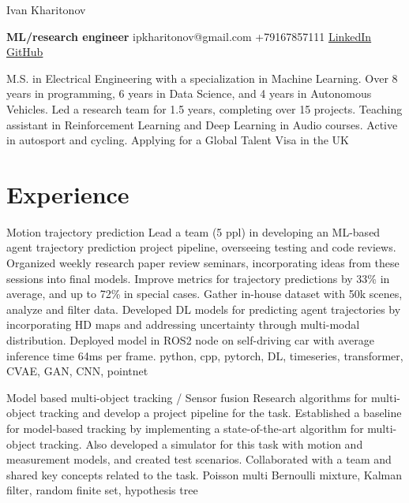 \documentclass[]{resume}
\begin{document}
\begin{center}
	\Huge Ivan Kharitonov \par
	\normalsize  \textbf{ML/research engineer} \hfill ipkharitonov@gmail.com \hfill +79167857111 \hfill \href{https://www.linkedin.com/in/ivan-kharitonov-main/}{LinkedIn} \hfill \href{https://github.com/kharitonov-ivan}{GitHub}
\end{center}
\vspace{-1em}

\noindent M.S. in Electrical Engineering with a specialization in Machine Learning. Over 8 years in programming, 6 years in Data Science, and 4 years in Autonomous Vehicles. Led a research team for 1.5 years, completing over 15 projects. Teaching assistant in Reinforcement Learning and Deep Learning in Audio courses. Active in autosport and cycling. Applying for a Global Talent Visa in the UK

\section*{\sectionformat Experience}
\project
{Motion trajectory prediction}
{Lead a team (5 ppl) in developing an ML-based agent trajectory prediction project pipeline, overseeing testing and code reviews. Organized weekly research paper review seminars, incorporating ideas from these sessions into final models.}
{Improve metrics for trajectory predictions by 33\% in average, and up to 72\% in special cases. Gather in-house dataset with 50k scenes, analyze and filter data. Developed DL models for predicting agent trajectories by incorporating HD maps and addressing uncertainty through multi-modal distribution. Deployed model in ROS2 node on self-driving car with average inference time 64ms per frame.}
{python, cpp, pytorch, DL, timeseries, transformer, CVAE, GAN, CNN, pointnet}

\project
{Model based multi-object tracking / Sensor fusion}
{Research algorithms for multi-object tracking and develop a project pipeline for the task.}
{Established a baseline for model-based tracking by implementing a state-of-the-art algorithm for multi-object tracking. Also developed a simulator for this task with motion and measurement models, and created test scenarios. Collaborated with a team and shared key concepts related to the task.}
{Poisson multi Bernoulli mixture, Kalman filter, random finite set, hypothesis tree}
\end{document}
